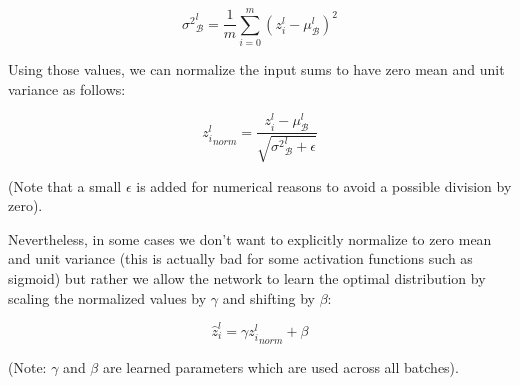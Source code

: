 \documentclass{article}
\begin{document}
\begin{equation}
{\sigma^2}^l_{\mathcal{B}} = \frac{1}{m}\sum^m_{i=0}(z^l_i - \mu^l_{\mathcal{B}})^2
\end{equation}

Using those values, we can normalize the input sums to have zero mean and unit variance as follows:

\begin{equation}
{z^l_i}_{norm} = \frac{z^l_i - \mu^l_\mathcal{B}}{\sqrt{{\sigma^2}^l_{\mathcal{B}}+ \epsilon}}
\end{equation}

(Note that a small $\epsilon$ is added for numerical reasons to avoid a possible division by zero).

Nevertheless, in some cases we don't want to explicitly normalize to zero mean and unit variance (this is actually bad for some activation functions such as sigmoid) but rather we allow the network to learn the optimal distribution by scaling the normalized values by $\gamma$ and shifting by $\beta$:

\begin{equation}
\hat{z}^l_i = \gamma {z^l_i}_{norm} + \beta
\end{equation}

(Note: $\gamma$ and $\beta$ are learned parameters which are used across all batches).
\end{document}
